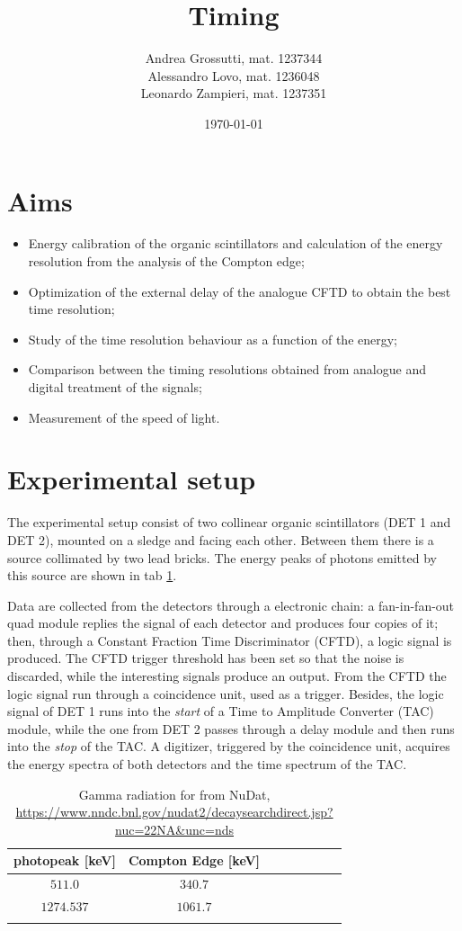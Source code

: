 \documentclass[11pt,a4 paper]{article}
\title{Timing}
\author{Andrea Grossutti, mat. 1237344\\Alessandro Lovo, mat. 1236048\\Leonardo Zampieri, mat. 1237351}
\date{\today}
\begin{document}
\maketitle

\section{Aims}
\begin{itemize}[noitemsep]
    \item Energy calibration of the organic scintillators and calculation of the energy resolution from the analysis of the Compton edge;
    \item Optimization of the external delay of the analogue CFTD to obtain the best time resolution;
    \item Study of the time resolution behaviour as a function of the energy;
    \item Comparison between the timing resolutions obtained from analogue and digital treatment of the signals;
    \item Measurement of the speed of light.
\end{itemize}

\section{Experimental setup}
The experimental setup consist of two collinear organic scintillators (DET 1 and DET 2), mounted on a sledge and facing each other. Between them there is a  source collimated by two lead bricks. The energy peaks of photons emitted by this source are shown in tab \ref{tab:gammavalue}.

Data are collected from the detectors through a electronic chain: a fan-in-fan-out quad module replies the signal of each detector and produces four copies of it; then, through a Constant Fraction Time Discriminator (CFTD), a logic signal is produced. The CFTD trigger threshold has been set so that the noise is discarded, while the interesting signals produce an output. From the CFTD the logic signal run through a coincidence unit, used as a trigger. Besides, the logic signal of DET 1 runs into the \emph{start} of a Time to Amplitude Converter (TAC) module, while the one from DET 2 passes through a delay module and then runs into the \emph{stop} of the TAC. A digitizer, triggered by the coincidence unit, acquires the energy spectra of both detectors and the time spectrum of the TAC.

\begin{table}[H]
    \centering
    \begin{tabular}{cccccccc}
        \toprule
        photopeak [keV] & Compton Edge [keV] \\
        \midrule
        $511.0$ & $340.7$\\
        $1274.537$ & $1061.7$ \\
        \bottomrule\vspace{0.01cm}
    \end{tabular}
    \caption{Gamma radiation for  from NuDat, \url{https://www.nndc.bnl.gov/nudat2/decaysearchdirect.jsp?nuc=22NA\&unc=nds}}
    \label{tab:gammavalue}
\end{table}
\end{document}
